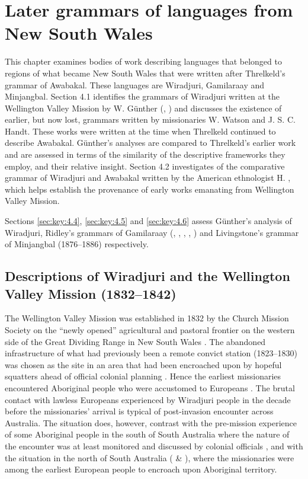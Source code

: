 \chapter{Later grammars of languages from New South Wales}
\label{chap:key:4}

This chapter examines bodies of work describing languages that belonged to regions of what became New South Wales that were written after Threlkeld’s grammar of Awabakal. These languages are Wiradjuri, Gamilaraay and Minjangbal.
Section 4.1 identifies the grammars of Wiradjuri written at the Wellington Valley Mission by W. Günther (\citeyear{gunther_native_1838}, \citeyear{gunther_lecture_1840}) and discusses the existence of earlier, but now lost, grammars written by missionaries W. Watson and J. S. C. Handt. These works were written at the time when Threlkeld continued to describe Awabakal. Günther’s analyses are compared to Threlkeld’s earlier work and are assessed in terms of the similarity of the descriptive frameworks they employ, and their relative insight. Section 4.2 investigates of the comparative grammar of Wiradjuri and Awabakal written by the American ethnologist H. \citet{hale_languages_1846}, which helps establish the provenance of early works emanating from Wellington Valley Mission.

Sections \ref{sec:key:4.4}, \ref{sec:key:4.5} and \ref{sec:key:4.6} assess Günther’s analysis of Wiradjuri, Ridley’s grammars of Gamilaraay (\citeyear{ridley_kamilaroi_1875}, \citeyear{ridley_kamilaroi_1866}, \citeyear{ridley_kamilaroi_1855}, \citeyear{ridley_kamilaroi_1855-1}, \citeyear{ridley_kamilaroi_1856}) and Livingstone’s grammar of Minjangbal (1876--1886) respectively. 

\section{Descriptions of Wiradjuri and the Wellington Valley Mission (1832--1842)}
\label{sec:key:4.1}

The Wellington Valley Mission was established in 1832 by the Church Mission Society on the “newly opened” agricultural and pastoral frontier on the western side of the Great Dividing Range in New South Wales \citep[324]{bridges_church_1978}. The abandoned infrastructure of what had previously been a remote convict station (1823--1830) was chosen as the site in an area that had been encroached upon by hopeful squatters ahead of official colonial planning \citep[285]{bridges_church_1978}. Hence the earliest missionaries encountered Aboriginal people who were accustomed to Europeans \citep[326]{bridges_church_1978}. The brutal contact with lawless Europeans experienced by Wiradjuri people in the decade before the missionaries' arrival is typical of post-invasion encounter across Australia. The situation does, however, contrast with the pre-mission experience of some Aboriginal people in the south of South Australia where the nature of the encounter was at least monitored and discussed by colonial officials \citep{scrimgeour_colinizers_2007}, and with the situation in the north of South Australia ( \& ), where the missionaries were among the earliest European people to encroach upon Aboriginal territory. 

